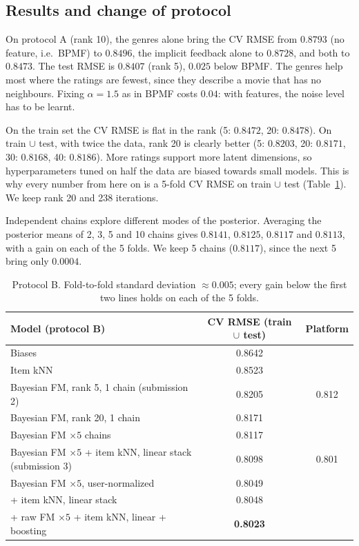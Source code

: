 \documentclass[11pt,a4paper]{article}
\begin{document}
\subsection{Results and change of protocol}\label{sec:protocol}
On protocol A (rank 10), the genres alone bring the CV RMSE from $0.8793$ (no feature, i.e.\ BPMF) to $0.8496$,
the implicit feedback alone to $0.8728$, and both to $0.8473$. The test RMSE is $0.8407$ (rank 5), $0.025$
below BPMF. The genres help most where the ratings are fewest, since they describe a movie that has no
neighbours. Fixing $\alpha = 1.5$ as in BPMF costs $0.04$: with features, the noise level has to be learnt.

On the train set the CV RMSE is flat in the rank (5: $0.8472$, 20: $0.8478$). On train $\cup$ test, with twice
the data, rank 20 is clearly better (5: $0.8203$, 20: $0.8171$, 30: $0.8168$, 40: $0.8186$). More ratings
support more latent dimensions, so hyperparameters tuned on half the data are biased towards small models.
This is why every number from here on is a 5-fold CV RMSE on train $\cup$ test (Table~\ref{tab:protocolB}).
We keep rank 20 and 238 iterations.

Independent chains explore different modes of the posterior. Averaging the posterior means of 2, 3, 5 and 10
chains gives $0.8141$, $0.8125$, $0.8117$ and $0.8113$, with a gain on each of the 5 folds. We keep 5 chains
($0.8117$), since the next 5 bring only $0.0004$.

\begin{table}[h]
\centering\small
\begin{tabular}{lcc}
\toprule
Model (protocol B) & CV RMSE (train $\cup$ test) & Platform \\
\midrule
Biases                                                     & 0.8642 & \\
Item kNN                                                   & 0.8523 & \\
Bayesian FM, rank 5, 1 chain (submission 2)                & 0.8205 & 0.812 \\
Bayesian FM, rank 20, 1 chain                              & 0.8171 & \\
Bayesian FM $\times 5$ chains                              & 0.8117 & \\
Bayesian FM $\times 5$ + item kNN, linear stack (submission 3) & 0.8098 & 0.801 \\
Bayesian FM $\times 5$, user-normalized                    & 0.8049 & \\
\quad + item kNN, linear stack                             & 0.8048 & \\
\quad + raw FM $\times 5$ + item kNN, linear + boosting    & \textbf{0.8023} & \\
\bottomrule
\end{tabular}
\caption{Protocol B. Fold-to-fold standard deviation $\approx 0.005$; every gain below the first two lines
holds on each of the 5 folds.}
\label{tab:protocolB}
\end{table}
\end{document}
